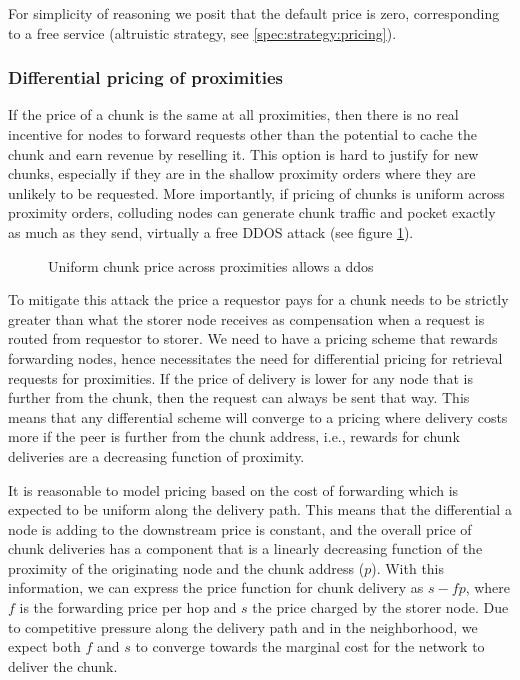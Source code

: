 For simplicity of reasoning we posit that the default price is zero, corresponding to a free service (altruistic strategy, see \ref{spec:strategy:pricing}). 

\subsubsection{Differential pricing of proximities}\label{sec:diff-pricing-prox}

If the price of a chunk is the same at all proximities, then there is no real incentive for nodes to forward requests other than the potential to cache the chunk and earn revenue by reselling it. This option is hard to justify for new chunks, especially if they are in the shallow proximity orders where they are unlikely to be requested. More importantly, if pricing of chunks is uniform across proximity orders, colluding nodes can generate chunk traffic and pocket exactly as much as they send, virtually a free DDOS attack (see figure \ref{fig:ddos-uniform-price}).

\begin{figure}[htbp]
   \centering
   \caption[Uniform chunk price across proximities allows a ddos]{Uniform chunk price across proximities allows a ddos}
   \label{fig:ddos-uniform-price}
\end{figure}

To mitigate this attack the price a requestor pays for a chunk needs to be strictly greater than what the storer node receives as compensation when a request is routed from requestor to storer. We need to have a pricing scheme that rewards forwarding nodes, hence necessitates the need for differential pricing for retrieval requests for proximities. If the price of delivery is lower for any node that is further from the chunk, then the request can always be sent that way. This means that any differential scheme will converge to a pricing where delivery costs more if the peer is further from the chunk address, i.e., rewards for chunk deliveries are a decreasing function of proximity. 

It is reasonable to model pricing based on the cost of forwarding which is expected to be uniform along the delivery path. This means that the differential a node is adding to the downstream price is constant, and the overall price of chunk deliveries has a component that is a linearly decreasing function of the proximity of the originating node and the chunk address ($p$). With this information, we can express the price function for chunk delivery as $s-fp$, where $f$ is the forwarding price per hop and $s$ the price charged by the storer node. Due to competitive pressure along the delivery path and in the neighborhood, we expect both $f$ and $s$ to converge towards the marginal cost for the network to deliver the chunk.

